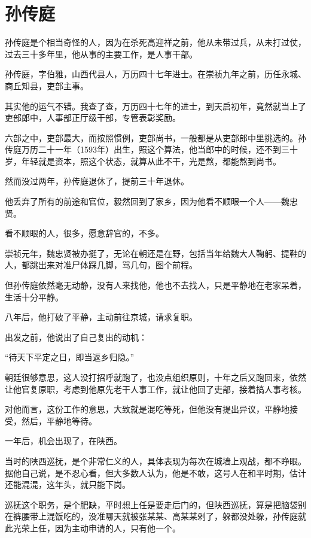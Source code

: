 \section{孙传庭}
\ifnum{}
	\begin{multicols}{\theparacolNo}
		\fi
		孙传庭是个相当奇怪的人，因为在杀死高迎祥之前，他从未带过兵，从未打过仗，过去三十多年里，他从事的主要工作，是人事干部。

		孙传庭，字伯雅，山西代县人，万历四十七年进士。在崇祯九年之前，历任永城、商丘知县，吏部主事。

		其实他的运气不错。我查了查，万历四十七年的进士，到天启初年，竟然就当上了吏部郎中，人事部正厅级干部，专管表彰奖励。

		六部之中，吏部最大，而按照惯例，吏部尚书，一般都是从吏部郎中里挑选的。孙传庭万历二十一年（1593年）出生，照这个算法，他当郎中的时候，还不到三十岁，年轻就是资本，照这个状态，就算从此不干，光是熬，都能熬到尚书。

		然而没过两年，孙传庭退休了，提前三十年退休。

		他丢弃了所有的前途和官位，毅然回到了家乡，因为他看不顺眼一个人——魏忠贤。

		看不顺眼的人，很多，愿意辞官的，不多。

		崇祯元年，魏忠贤被办挺了，无论在朝还是在野，包括当年给魏大人鞠躬、提鞋的人，都跳出来对准尸体踩几脚，骂几句，图个前程。

		但孙传庭依然毫无动静，没有人来找他，他也不去找人，只是平静地在老家呆着，生活十分平静。

		八年后，他打破了平静，主动前往京城，请求复职。

		出发之前，他说出了自己复出的动机：

		“待天下平定之日，即当返乡归隐。”

		朝廷很够意思，这人没打招呼就跑了，也没点组织原则，十年之后又跑回来，依然让他官复原职，考虑到他原先老干人事工作，就让他回了吏部，接着搞人事考核。

		对他而言，这份工作的意思，大致就是混吃等死，但他没有提出异议，平静地接受，然后，平静地等待。

		一年后，机会出现了，在陕西。

		当时的陕西巡抚，是个非常仁义的人，具体表现为每次在城墙上观战，都不睁眼。据他自己说，是不忍心看，但大多数人认为，他是不敢，这号人在和平时期，估计还能混混，这年头，就只能下岗。

		巡抚这个职务，是个肥缺，平时想上任是要走后门的，但陕西巡抚，算是把脑袋别在裤腰带上混饭吃的，没准哪天就被张某某、高某某剁了，躲都没处躲，孙传庭就此光荣上任，因为主动申请的人，只有他一个。


\end{multicols}

